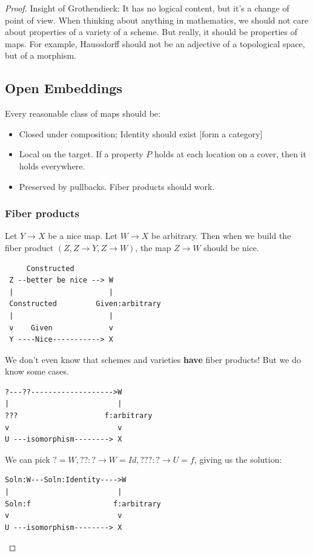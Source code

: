 \documentclass{book}
\theoremstyle{definition}
\begin{document}
\begin{proof}
Insight of Grothendieck: It has no logical content, but it's a change of point
of view. When thinking about anything in mathematics, we should not care about
properties of a variety of a scheme. But really, it should be properties of maps.
For example, Haussdorff should not be an adjective of a topological space, but
of a morphism.


\subsection{Open Embeddings}

Every reasonable class of maps should be:
\begin{itemize}
\item Closed under composition; Identity should exist [form a category]
\item Local on the target. If a property $P$ holds at each location on a cover,
      then it holds everywhere.
\item Preserved by pullbacks. Fiber products should work.
\end{itemize}

\subsubsection{Fiber products}
Let $Y \rightarrow X$ be a nice map. Let $W \rightarrow X$ be arbitrary. Then
when we build the fiber product $(Z, Z \rightarrow Y, Z \rightarrow W)$, 
the map $Z \rightarrow W$ should be nice.

\begin{verbatim}
     Constructed
 Z --better be nice --> W
 |                      |
 Constructed         Given:arbitrary
 |                      |
 v    Given             v
 Y ----Nice-----------> X
\end{verbatim}

We don't even know that schemes and varieties \textbf{have} fiber products!
But we do know some cases.

\begin{verbatim}
?---??------------------->W
|                         |
???                    f:arbitrary
v                         v
U ---isomorphism--------> X
\end{verbatim}

We can pick $? = W, ??: ? \rightarrow W = Id, ???: ? \rightarrow U = f$,
giving us the solution:

\begin{verbatim}
Soln:W---Soln:Identity---->W
|                         |
Soln:f                   f:arbitrary
v                         v
U ---isomorphism--------> X
\end{verbatim}


\end{proof}
\end{document}
